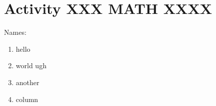 \documentclass[10pt]{article}
\begin{document}
	
	\section*{\textbf{Activity XXX \hfill MATH XXXX}}
	
	\vspace{.25in}
	
	Names: \hrulefill
	
	\begin{multicols*}{2}
		
		\begin{enumerate}
			\item hello
			
			\vfill
			
			\item world
			\vfill 
			{\color{white} ugh} %
			
			\columnbreak
			
			\item another
			
			\vfill
			
			\item column
			
			\vfill\vfill
			
		\end{enumerate}
		
	\end{multicols*}
\end{document}

